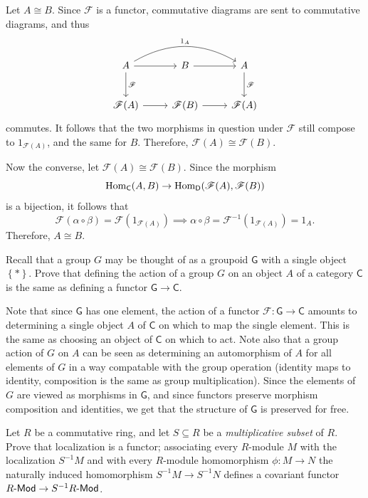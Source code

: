 \documentclass[11pt]{report}
\begin{document}
\begin{solution}
	Let $A\cong B$. Since $\mathscr{F} $ is a functor, commutative diagrams are sent to commutative diagrams, and thus
	\[\begin{tikzcd}[row sep = 2.5em, column sep = 2.5em]
		A\arrow[r]\arrow[rr, bend left, "1_A"]\arrow[d, "\mathscr{F} "]&B\arrow[r]&A\arrow[d, "\mathscr{F} "]\\
		\mathscr{F} (A)\arrow[r]&\mathscr{F} (B)\arrow[r]&\mathscr{F} (A)
	\end{tikzcd}\]
	commutes. It follows that the two morphisms in question under $\mathscr{F} $ still compose to $1_{\mathscr{F} \left( A \right) } $, and the same for $B$. Therefore, $\mathscr{F} (A)\cong \mathscr{F} (B)$.

	Now the converse, let $\mathscr{F} (A)\cong \mathscr{F} \left( B \right) $. Since the morphism
	\[
		\operatorname{Hom}_{\mathsf{C} }(A, B) \to \operatorname{Hom}_{\mathsf{D} }(\mathscr{F} (A), \mathscr{F} (B)) 
	\]
	is a bijection, it follows that
	\[
		\mathscr{F} (\alpha \circ \beta )=\mathscr{F} (1_{\mathscr{F} (A)} )\implies \alpha \circ \beta =\mathscr{F} ^{-1} (1_{\mathscr{F} (A)} )=1_A
	.\]
	Therefore, $A\cong B$.
\end{solution}
\begin{exercise}
	Recall that a group $G$ may be thought of as a groupoid $\mathsf{G} $ with a single object $\left\{ * \right\} $. Prove that defining the action of a group $G$ on an object $A$ of a category $\mathsf{C} $ is the same as defining a functor $\mathsf{G} \to \mathsf{C} $.
\end{exercise}
\begin{solution}
	Note that since $\mathsf{G} $ has one element, the action of a functor $\mathscr{F} : \mathsf{G}  \to \mathsf{C} $ amounts to determining a single object $A$ of $\mathsf{C} $ on which to map the single element. This is the same as choosing an object of $\mathsf{C} $ on which to act. Note also that a group action of $G$ on $A$ can be seen as determining an automorphism of $A$ for all elements of $G$ in a way compatable with the group operation (identity maps to identity, composition is the same as group multiplication). Since the elements of $G$ are viewed as morphisms in $\mathsf{G} $, and since functors preserve morphism composition and identities, we get that the structure of $\mathsf{G} $ is preserved for free.
\end{solution}

\begin{exercise}
	Let $R$ be a commutative ring, and let $S\subseteq R$ be a \emph{multiplicative subset} of $R$. Prove that localization is a functor; associating every $R$-module $M$ with the localization $S^{-1} M$ and with every $R$-module homomorphism $\phi : M \to N$ the naturally induced homomorphism $S^{-1} M\to S^{-1} N$ defines a covariant functor $R\text{-}\mathsf{Mod} \to S^{-1} R\text{-}\mathsf{Mod} $.
\end{exercise}
\end{document}
